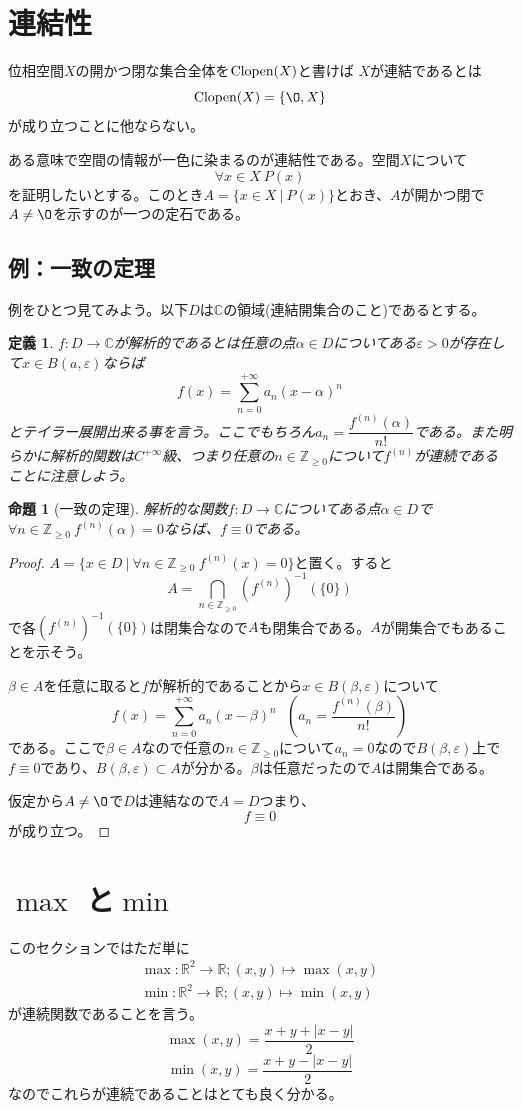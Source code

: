 \documentclass[leqno]{jsarticle}
\newtheorem{prop}[thm]{命題}
\newtheorem{df}[thm]{定義}
\newcommand{\zz}{\mathbb{Z}}
\newcommand{\rr}{\mathbb{R}}
\newcommand{\cc}{\mathbb{C}}
\newcommand{\mgn}{\infty}
\newcommand{\ep}{\varepsilon}
\newcommand{\al}{\alpha}
\newcommand{\be}{\beta}
\newcommand{\clop}{\text{{\rm Clopen}}}
\begin{document}
\section{連結性}
位相空間$X$の開かつ閉な集合全体を$\clop(X)$と書けば
$X$が連結であるとは
\[
\clop(X)=\{\O,X\}
\]
が成り立つことに他ならない。\par
ある意味で空間の情報が一色に染まるのが連結性である。空間$X$について
\[
\forall x\in X\ P(x)
\]
を証明したいとする。このとき$A=\{x\in X\ |\ P(x)\}$とおき、$A$が開かつ閉で$A\neq\O$を示すのが一つの定石である。
\subsection{例：一致の定理}
例をひとつ見てみよう。以下$D$は$\cc$の領域(連結開集合のこと)であるとする。
\begin{df}
$f:D\to \cc$が解析的であるとは任意の点$\al\in D$についてある$\ep>0$が存在して$x\in B(a,\ep)$ならば
\[
f(x)=\sum_{n=0}^{+\mgn}a_n(x-\al)^n
\]
とテイラー展開出来る事を言う。ここでもちろん$a_n=\dfrac{f^{(n)}(\al)}{n!}$である。また明らかに解析的関数は$C^{+\mgn}$級、つまり任意の$n\in \zz_{\ge 0}$について$f^{(n)}$が連続であることに注意しよう。
\end{df}
\begin{prop}[一致の定理]
解析的な関数$f:D\to \cc$についてある点$\al\in D$で$\forall n\in \zz_{\ge 0}\ f^{(n)}(\al)=0$ならば、$f\equiv 0$である。
\end{prop}
\begin{proof}
$A=\{x\in D\ |\ \forall n\in \zz_{\ge 0}\ f^{(n)}(x)=0\}$と置く。すると
\[
A=\bigcap_{n\in \zz_{\ge 0}}(f^{(n)})^{-1}(\{0\})
\]
で各$(f^{(n)})^{-1}(\{0\})$は閉集合なので$A$も閉集合である。$A$が開集合でもあることを示そう。
\par
$\be \in A$を任意に取ると$f$が解析的であることから$x\in B(\be,\ep)$について
\[
f(x)=\sum_{n=0}^{+\mgn}a_n(x-\be)^n\ \ \ (a_n=\dfrac{f^{(n)}(\be)}{n!})
\]
である。ここで$\be\in A$なので任意の$n\in \zz_{\ge 0}$について$a_n=0$なので$B(\be,\ep)$上で$f\equiv 0$であり、$B(\be,\ep)\subset A$が分かる。$\be$は任意だったので$A$は開集合である。
\par
仮定から$A\neq\O$で$D$は連結なので$A=D$つまり、
\[
f\equiv 0
\]が成り立つ。
\end{proof}


\section{$\max$ と$\min$}
このセクションではただ単に
\begin{align*}
\max:\rr^2\to \rr;(x,y)\mapsto \max(x,y)\\
 \min:\rr^2\to \rr;(x,y)\mapsto \min(x,y)
\end{align*}
が連続関数であることを言う。
\[
\max(x,y)=\frac{x+y+|x-y|}{2}
\]
\[
\min(x,y)=\frac{x+y-|x-y|}{2}
\]
なのでこれらが連続であることはとても良く分かる。
\end{document}
